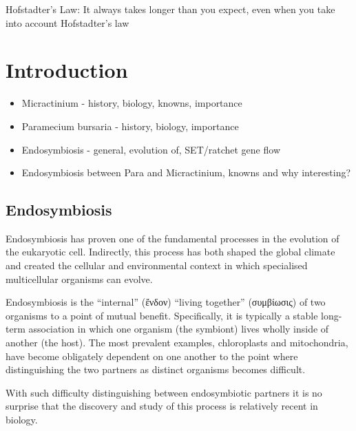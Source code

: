 \graphicspath{{chapters/1.Introduction/figures/}}

\begin{savequote}[75mm]
Hofstadter's Law: It always takes longer than you expect, even when you take into account Hofstadter's law
\end{savequote}

\chapter{Introduction}

\begin{itemize}
    \item Micractinium - history, biology, knowns, importance
    \item Paramecium bursaria - history, biology, importance
    \item Endosymbiosis - general, evolution of, SET/ratchet gene flow
    \item Endosymbiosis between Para and Micractinium, knowns and why interesting?
\end{itemize}

\section{Endosymbiosis}

Endosymbiosis has proven one of the fundamental processes in the evolution of the
eukaryotic cell. Indirectly, this process has both shaped the global climate and
created the cellular and environmental context in which specialised multicellular
organisms can evolve. 

Endosymbiosis is the ``internal'' (ἔνδον) ``living together'' (συμβίωσις)
of two organisms to a point of mutual benefit.  Specifically, it is typically
 a stable long-term association in which one organism (the symbiont) lives wholly 
 inside of another (the host). The most prevalent examples, chloroplasts
 and mitochondria, have become obligately dependent on one another to the point
 where distinguishing the two partners as distinct organisms becomes difficult.

With such difficulty distinguishing between endosymbiotic partners it is no 
surprise that the discovery and study of this process is relatively recent in 
biology. 

